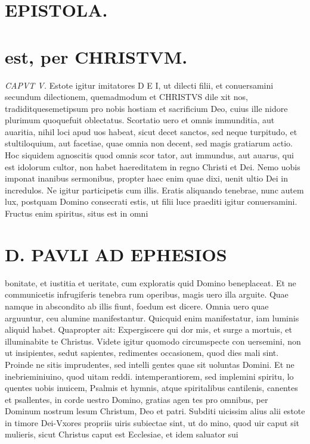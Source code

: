 \documentclass{article}
\begin{document}
\begin{pages}
\section*{EPISTOLA.  }
\section*{est, per CHRISTVM.  }
\marginpar{[ p.u ]}
\marginpar{[ p.1.  ]}
\marginpar{[ p.2.  ]}
\marginpar{[ p.3.  ]}
\marginpar{[ p.4.  ]}
\marginpar{[ p.5.  ]}
\textit{CAPVT V.  }\pstart Estote igitur imitatores D E I, ut dilecti filii, et conuersamini secundum dilectionem, quemadmodum et CHRISTVS dile xit nos, tradiditquesemetipsum pro nobis hostiam et sacrificium Deo, cuius ille nidore plurimum quoquefuit oblectatus.  \pend\pstart Scortatio uero et omnis immunditia, aut auaritia, nihil loci apud uos habeat, sicut decet sanctos, sed neque turpitudo, et stultiloquium, aut facetiae, quae omnia non decent, sed magis gratiarum actio.  \pend\pstart Hoc siquidem agnoscitis quod omnis scor tator, aut immundus, aut auarus, qui est idolorum cultor, non habet haereditatem in regno Christi et Dei. Nemo uobis imponat inanibus sermonibus, propter haec enim quae dixi, uenit ultio Dei in incredulos.  \pend\pstart Ne igitur participetis cum illis. Eratis aliquando tenebrae, nunc autem lux, postquam Domino consecrati estis, ut filii luce praediti igitur conuersamini.  \pend\pstart Fructus enim spiritus, situs est in omni  \pend
\section*{D. PAVLI AD EPHESIOS }
\marginpar{[ p.6.  ]}
\marginpar{[ p.7.  ]}
\marginpar{[ p.8.  ]}
\marginpar{[ p.9.  ]}\pstart bonitate, et iustitia et ueritate, cum exploratis quid Domino beneplaceat.  \pend\pstart Et ne communicetis infrugiferis tenebra rum operibus, magis uero illa arguite. Quae namque in abscondito ab illis fiunt, foedum est dicere. Omnia uero quae arguuntur, ceu alumine manifestantur. Quicquid enim manifestatur, iam luminis aliquid habet. Quapropter ait: Expergiscere qui dor mis, et surge a mortuis, et illuminabite te Christus.  \pend\pstart Videte igitur quomodo circumspecte con uersemini, non ut insipientes, sedut sapientes, redimentes occasionem, quod dies mali sint. Proinde ne sitis imprudentes, sed intelli gentes quae sit uoluntas Domini.  \pend\pstart Et ne inebrieminiuino, quod uitam reddi. intemperantiorem, sed implemini spiritu, lo quentes uobis inuicem, Psalmis et hymnis, atque spiritalibus cantilenis, canentes et psallentes, in corde uestro Domino, gratias agen tes pro omnibus, per Dominum nostrum lesum Christum, Deo et patri.  \pend\pstart Subditi uicissim alius alii estote in timore Dei-Vxores propriis uiris subiectae sint, ut do mino, quod uir caput sit mulieris, sicut Christus caput est Ecclesiae, et idem saluator sui  \pend

\end{pages}
\end{document}
